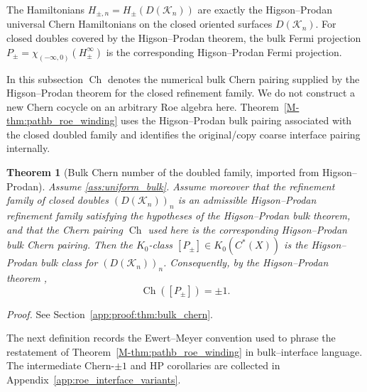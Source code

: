 \documentclass[11pt]{article}
\numberwithin{equation}{section}
\newtheorem{theorem}{Theorem}[section]
\theoremstyle{definition}
\theoremstyle{remark}
\newcommand{\proofref}[1]{%
  \par\noindent\emph{Proof.} See Section~\ref{#1}.\par\medskip
}
\newcommand{\proofappendixref}[1]{\proofref{#1}}
\newcommand{\K}{\mathcal{K}}
\newcommand{\Ch}{\operatorname{Ch}}
\begin{document}
The Hamiltonians $H_{\pm,n}=H_\pm(D(\K_n))$ are exactly the Higson--Prodan universal Chern
Hamiltonians on the closed oriented surfaces $D(\K_n)$. For closed doubles covered by the
Higson--Prodan theorem, the bulk Fermi projection
$P_\pm=\chi_{(-\infty,0)}(H_\pm^\infty)$ is the corresponding Higson--Prodan Fermi projection.

In this subsection \(\Ch\) denotes the numerical bulk Chern pairing supplied by the
Higson--Prodan theorem for the closed refinement family. We do not construct a new Chern cocycle on
an arbitrary Roe algebra here. Theorem~\ref{M-thm:pathb_roe_winding} uses the Higson--Prodan bulk
pairing associated with the closed doubled family and identifies the original/copy coarse interface
pairing internally.

\begin{theorem}[Bulk Chern number of the doubled family, imported from Higson--Prodan]\label{thm:bulk_chern}
Assume \ref{ass:uniform_bulk}. Assume moreover that the refinement family of closed doubles
$(D(\K_n))_n$ is an admissible Higson--Prodan refinement family satisfying the hypotheses of the
Higson--Prodan bulk theorem, and that the Chern pairing $\Ch$ used here is the corresponding
Higson--Prodan bulk Chern pairing. Then the $K_0$-class
$[P_\pm]\in K_0(C^*(X))$ is the Higson--Prodan bulk class for $(D(\K_n))_n$.
Consequently, by the Higson--Prodan theorem
\cite{HigsonProdanUniversalPRL,HigsonProdanUniversalArxiv},
\[
\Ch([P_\pm])=\pm1.
\]
\end{theorem}
\proofappendixref{app:proof:thm:bulk_chern}




The next definition records the Ewert--Meyer convention used to phrase the restatement of
Theorem~\ref{M-thm:pathb_roe_winding} in bulk--interface language. The intermediate Chern-\(\pm1\)
and HP corollaries are collected in Appendix~\ref{app:roe_interface_variants}.
\end{document}
